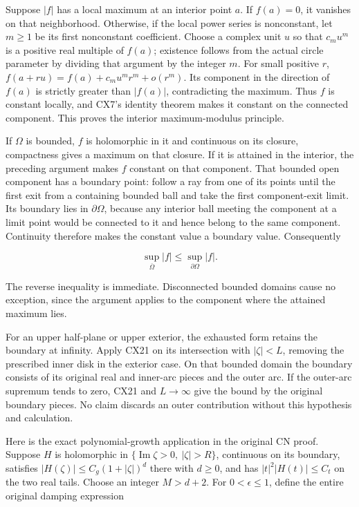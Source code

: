 \documentclass[
  11pt,
]{article}
\begin{document}
Suppose \(|f|\) has a local maximum at an interior point \(a\). If
\(f(a)=0\), it vanishes on that neighborhood. Otherwise, if the local
power series is nonconstant, let \(m\geq1\) be its first nonconstant
coefficient. Choose a complex unit \(u\) so that \(c_m u^m\) is a
positive real multiple of \(f(a)\); existence follows from the actual
circle parameter by dividing that argument by the integer \(m\). For
small positive \(r\), \(f(a+ru)=f(a)+c_m u^m r^m+o(r^m)\). Its component
in the direction of \(f(a)\) is strictly greater than \(|f(a)|\),
contradicting the maximum. Thus \(f\) is constant locally, and CX7's
identity theorem makes it constant on the connected component. This
proves the interior maximum-modulus principle.

If \(\Omega\) is bounded, \(f\) is holomorphic in it and continuous on
its closure, compactness gives a maximum on that closure. If it is
attained in the interior, the preceding argument makes \(f\) constant on
that component. That bounded open component has a boundary point: follow
a ray from one of its points until the first exit from a containing
bounded ball and take the first component-exit limit. Its boundary lies
in \(\partial\Omega\), because any interior ball meeting the component
at a limit point would be connected to it and hence belong to the same
component. Continuity therefore makes the constant value a boundary
value. Consequently

\[
\sup_{\overline\Omega}|f|\leq\sup_{\partial\Omega}|f|.
\tag{CX21}
\]

The reverse inequality is immediate. Disconnected bounded domains cause
no exception, since the argument applies to the component where the
attained maximum lies.

For an upper half-plane or upper exterior, the exhausted form retains
the boundary at infinity. Apply CX21 on its intersection with
\(|\zeta|<L\), removing the prescribed inner disk in the exterior case.
On that bounded domain the boundary consists of its original real and
inner-arc pieces and the outer arc. If the outer-arc supremum tends to
zero, CX21 and \(L\to\infty\) give the bound by the original boundary
pieces. No claim discards an outer contribution without this hypothesis
and calculation.

Here is the exact polynomial-growth application in the original CN
proof. Suppose \(H\) is holomorphic in
\(\{\operatorname{Im}\zeta>0,\ |\zeta|>R\}\), continuous on its
boundary, satisfies \(|H(\zeta)|\leq C_g(1+|\zeta|)^d\) there with
\(d\geq0\), and has \(|t|^2|H(t)|\leq C_t\) on the two real tails.
Choose an integer \(M>d+2\). For \(0<\epsilon\leq1\), define the entire
original damping expression
\end{document}
